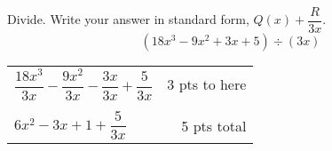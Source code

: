 
{
	Divide. Write your answer in standard form, $Q(x)+\dfrac{R}{3x}$.
	$$(18x^3-9x^2+3x+5)\div(3x)$$
}
{
	\begin{tabular}{l r}
	$\dfrac{18x^3}{3x}-\dfrac{9x^2}{3x}-\dfrac{3x}{3x}+\dfrac{5}{3x}$ & 3 pts to here\\ \\
	$6x^2-3x+1+\dfrac{5}{3x} $ & 5 pts total
	\end{tabular}
}
